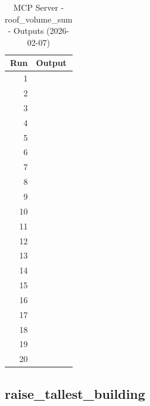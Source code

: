 \documentclass[a4paper,11pt]{article}
\begin{document}
\clearpage

\begin{table}[ht]
\centering
\scriptsize
\caption{MCP Server - roof\_volume\_sum - Outputs (2026-02-07)}
\label{tab:mcp\_roof\_volume\_sum\_outputs\_2026-02-07}
\begin{tabular}{r p{12cm}}
\hline
Run & Output \\
\hline
1 &  \\
2 &  \\
3 &  \\
4 &  \\
5 &  \\
6 &  \\
7 &  \\
8 &  \\
9 &  \\
10 &  \\
11 &  \\
12 &  \\
13 &  \\
14 &  \\
15 &  \\
16 &  \\
17 &  \\
18 &  \\
19 &  \\
20 &  \\
\hline
\end{tabular}
\end{table}

\clearpage
\subsection{raise\_tallest\_building}
\end{document}
